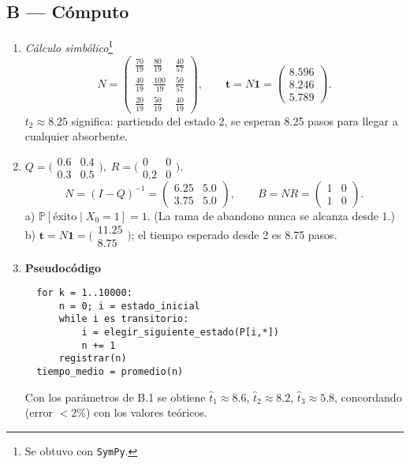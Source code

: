 \documentclass[11pt,spanish]{article}
\newcommand{\Prob}{\mathbb{P}}
\begin{document}
\subsection*{B — Cómputo}
\begin{enumerate}[label=\textbf{B.\arabic*}]
  \item \emph{Cálculo simbólico}\footnote{Se obtuvo con \texttt{SymPy}.}  
        \[
          N=\begin{pmatrix}
                \tfrac{70}{19} & \tfrac{80}{19} & \tfrac{40}{57}\\
                \tfrac{40}{19} & \tfrac{100}{19}& \tfrac{50}{57}\\
                \tfrac{20}{19} & \tfrac{50}{19} & \tfrac{40}{19}
             \end{pmatrix},
          \qquad
          \bm t = N\bm1 =
          \begin{pmatrix} \mathbf{8.596}\\[2pt] 8.246\\[2pt] 5.789 \end{pmatrix}.
        \]
        \(t_2\approx8.25\) significa: partiendo del estado 2, se esperan 8.25 pasos para llegar a cualquier absorbente.

  \item \(Q=\bigl(\begin{smallmatrix}0.6&0.4\\0.3&0.5\end{smallmatrix}\bigr),\;
        R=\bigl(\begin{smallmatrix}0&0\\0.2&0\end{smallmatrix}\bigr).\)
        \[
          N=(I-Q)^{-1}
            =\begin{pmatrix}6.25&5.0\\3.75&5.0\end{pmatrix},\qquad
          B=NR=\begin{pmatrix}1&0\\1&0\end{pmatrix}.
        \]
        a) \(\Prob[\text{éxito}\mid X_0=1]=1\).  (La rama de abandono nunca se alcanza desde 1.)  
        b) \(\bm t=N\bm1 = \bigl(\begin{smallmatrix}11.25\\\mathbf{8.75}\end{smallmatrix}\bigr)\);
           el tiempo esperado desde 2 es 8.75 pasos.

  \item \textbf{Pseudocódigo}
\begin{verbatim}
  for k = 1..10000:
      n = 0; i = estado_inicial
      while i es transitorio:
          i = elegir_siguiente_estado(P[i,*])
          n += 1
      registrar(n)
  tiempo_medio = promedio(n)
\end{verbatim}
        Con los parámetros de B.1 se obtiene \(\hat t_1\approx8.6\), \(\hat t_2\approx8.2\), \(\hat t_3\approx5.8\), 
        concordando (error $<2\%$) con los valores teóricos.
\end{enumerate}
\end{document}
